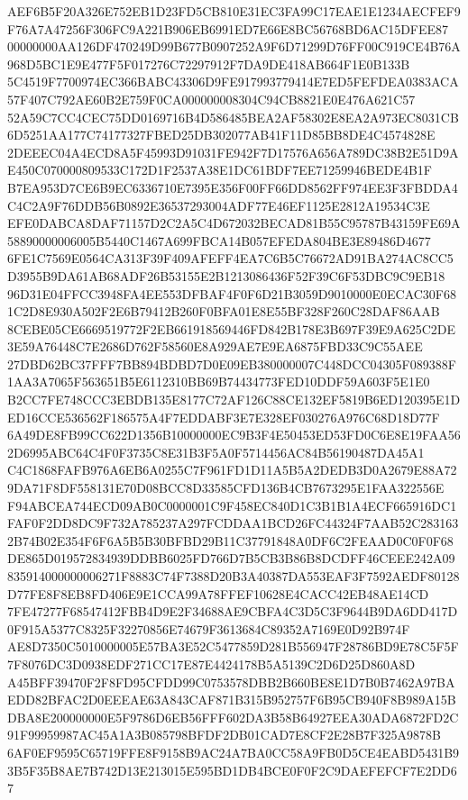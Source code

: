 \documentclass[UTF8,fontset=fandol,zihao=-4,a4paper]{ctexart}
\begin{document}
{{AEF6B5F20A326E752EB1D23FD5CB810E31EC3FA99C17EAE1E1234AECFEF9F76A7A47256F306FC9A221B906EB6991ED7E66E8BC56768BD6AC15DFEE87
00000000AA126DF470249D99B677B0907252A9F6D71299D76FF00C919CE4B76A968D5BC1E9E477F5F017276C72297912F7DA9DE418AB664F1E0B133B
5C4519F7700974EC366BABC43306D9FE917993779414E7ED5FEFDEA0383ACA57F407C792AE60B2E759F0CA000000008304C94CB8821E0E476A621C57
52A59C7CC4CEC75DD0169716B4D586485BEA2AF58302E8EA2A973EC8031CB6D5251AA177C74177327FBED25DB302077AB41F11D85BB8DE4C4574828E
2DEEEC04A4ECD8A5F45993D91031FE942F7D17576A656A789DC38B2E51D9AE450C070000809533C172D1F2537A38E1DC61BDF7EE71259946BEDE4B1F
B7EA953D7CE6B9EC6336710E7395E356F00FF66DD8562FF974EE3F3FBDDA4C4C2A9F76DDB56B0892E36537293004ADF77E46EF1125E2812A19534C3E
EFE0DABCA8DAF71157D2C2A5C4D672032BECAD81B55C95787B43159FE69A58890000006005B5440C1467A699FBCA14B057EFEDA804BE3E89486D4677
6FE1C7569E0564CA313F39F409AFEFF4EA7C6B5C76672AD91BA274AC8CC5D3955B9DA61AB68ADF26B53155E2B1213086436F52F39C6F53DBC9C9EB18
96D31E04FFCC3948FA4EE553DFBAF4F0F6D21B3059D9010000E0ECAC30F681C2D8E930A502F2E6B79412B260F0BFA01E8E55BF328F260C28DAF86AAB
8CEBE05CE6669519772F2EB661918569446FD842B178E3B697F39E9A625C2DE3E59A76448C7E2686D762F58560E8A929AE7E9EA6875FBD33C9C55AEE
27DBD62BC37FFF7BB894BDBD7D0E09EB380000007C448DCC04305F089388F1AA3A7065F563651B5E6112310BB69B74434773FED10DDF59A603F5E1E0
B2CC7FE748CCC3EBDB135E8177C72AF126C88CE132EF5819B6ED120395E1DED16CCE536562F186575A4F7EDDABF3E7E328EF030276A976C68D18D77F
6A49DE8FB99CC622D1356B10000000EC9B3F4E50453ED53FD0C6E8E19FAA562D6995ABC64C4F0F3735C8E31B3F5A0F5714456AC84B56190487DA45A1
C4C1868FAFB976A6EB6A0255C7F961FD1D11A5B5A2DEDB3D0A2679E88A729DA71F8DF558131E70D08BCC8D33585CFD136B4CB7673295E1FAA322556E
F94ABCEA744ECD09AB0C0000001C9F458EC840D1C3B1B1A4ECF665916DC1FAF0F2DD8DC9F732A785237A297FCDDAA1BCD26FC44324F7AAB52C283163
2B74B02E354F6F6A5B5B30BFBD29B11C37791848A0DF6C2FEAAD0C0F0F68DE865D019572834939DDBB6025FD766D7B5CB3B86B8DCDFF46CEEE242A09
835914000000006271F8883C74F7388D20B3A40387DA553EAF3F7592AEDF80128D77FE8F8EB8FD406E9E1CCA99A78FFEF10628E4CACC42EB48AE14CD
7FE47277F68547412FBB4D9E2F34688AE9CBFA4C3D5C3F9644B9DA6DD417D0F915A5377C8325F32270856E74679F3613684C89352A7169E0D92B974F
AE8D7350C5010000005E57BA3E52C5477859D281B556947F28786BD9E78C5F5F7F8076DC3D0938EDF271CC17E87E4424178B5A5139C2D6D25D860A8D
A45BFF39470F2F8FD95CFDD99C0753578DBB2B660BE8E1D7B0B7462A97BAEDD82BFAC2D0EEEAE63A843CAF871B315B952757F6B95CB940F8B989A15B
DBA8E200000000E5F9786D6EB56FFF602DA3B58B64927EEA30ADA6872FD2C91F99959987AC45A1A3B085798BFDF2DB01CAD7E8CF2E28B7F325A9878B
6AF0EF9595C65719FFE8F9158B9AC24A7BA0CC58A9FB0D5CE4EABD5431B93B5F35B8AE7B742D13E213015E595BD1DB4BCE0F0F2C9DAEFEFCF7E2DD67
}}
\end{document}
